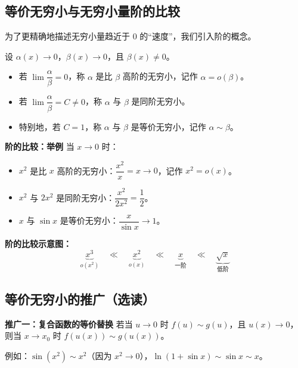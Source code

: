 \documentclass{ctexart}
\newenvironment{extra}{\begin{mdframed}[style=extrastyle, frametitle={* 选读内容（不要求掌握）}]}{\end{mdframed}}
\newenvironment{custom}[1]{\par\noindent \textbf{#1}\quad}{\par\vspace{1em}}
\begin{document}
\begin{example}[加减结构中的错误示例]
\subsection{等价无穷小与无穷小量阶的比较}

为了更精确地描述无穷小量趋近于 0 的“速度”，我们引入阶的概念。

\begin{definition}[无穷小的阶]
设 \(\alpha(x) \to 0\)，\(\beta(x) \to 0\)，且 \(\beta(x) \neq 0\)。
\begin{itemize}
\item 若 \(\lim \dfrac{\alpha}{\beta} = 0\)，称 \(\alpha\) 是比 \(\beta\) 高阶的无穷小，记作 \(\alpha = o(\beta)\)。
\item 若 \(\lim \dfrac{\alpha}{\beta} = C \neq 0\)，称 \(\alpha\) 与 \(\beta\) 是同阶无穷小。
\item 特别地，若 \(C = 1\)，称 \(\alpha\) 与 \(\beta\) 是等价无穷小，记作 \(\alpha \sim \beta\)。
\end{itemize}
\end{definition}

\begin{custom}{阶的比较：举例}
当 \(x \to 0\) 时：
\begin{itemize}
\item \(x^2\) 是比 \(x\) 高阶的无穷小：\(\dfrac{x^2}{x} = x \to 0\)，记作 \(x^2 = o(x)\)。
\item \(x^2\) 与 \(2x^2\) 是同阶无穷小：\(\dfrac{x^2}{2x^2} = \dfrac{1}{2}\)。
\item \(x\) 与 \(\sin x\) 是等价无穷小：\(\dfrac{x}{\sin x} \to 1\)。
\end{itemize}

\textbf{阶的比较示意图：}
\[
\underbrace{x^3}_{o(x^2)} \quad \ll \quad \underbrace{x^2}_{o(x)} \quad \ll \quad \underbrace{x}_{\text{一阶}} \quad \ll \quad \underbrace{\sqrt{x}}_{\text{低阶}}
\]
\end{custom}


\begin{extra}
\subsection*{等价无穷小的推广（选读）}

\begin{custom}{推广一：复合函数的等价替换}
若当 \(u \to 0\) 时 \(f(u) \sim g(u)\)，且 \(u(x) \to 0\)，则当 \(x \to x_0\) 时 \(f(u(x)) \sim g(u(x))\)。

例如：\(\sin(x^2) \sim x^2\)（因为 \(x^2 \to 0\)），\(\ln(1+\sin x) \sim \sin x \sim x\)。


\end{custom}
\end{extra}
\end{example}
\end{document}
